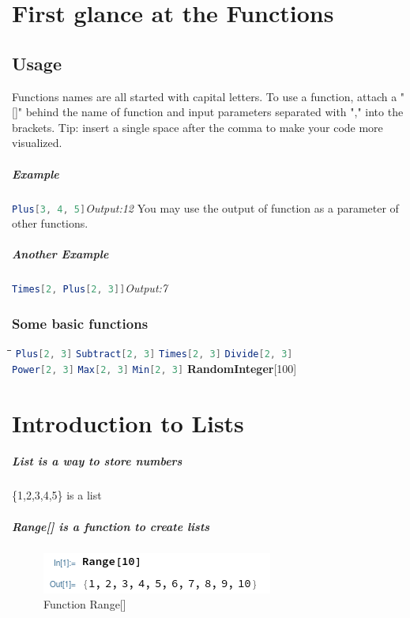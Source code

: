 \documentclass[UTF8]{book}
\newcommand{\iocode}[2]{\lstinline[language=Mathematica]|#1|\hspace{\fill}\emph{Output:#2}}
\newcommand{\incode}[1]{\lstinline[language=Mathematica]|#1|}
\begin{document}
		\chapter{First glance at the Functions}

			\section{Usage}
				Functions names are all started with capital letters. To use a function, attach a "[]" behind the name of function and input parameters separated with "," into the brackets. Tip: insert a single space after the comma to make your code more visualized.
				\paragraph{Example}
				\iocode{Plus[3, 4, 5]}{12}
				\newline\newline
				You may use the output of function as a parameter of other functions.
				\paragraph{Another Example}
				\iocode{Times[2, Plus[2, 3]]}{7}
			\subsection{Some basic functions}
			\begin{tabbing}
				\hspace{0.25\linewidth}\=\hspace{0.25\linewidth}\=\hspace{0.25\linewidth}\=\kill
				\incode{Plus[2, 3]} \> \incode{Subtract[2, 3]} \> \incode{Times[2, 3]} \> \incode{Divide[2, 3]} \\ 
				\incode{Power[2, 3]} \> \incode{Max[2, 3]} \> \incode{Min[2, 3]} \> \textbf{RandomInteger}[100] \\ 
			\end{tabbing} 
		\chapter{Introduction to Lists}
			\paragraph{List is a way to store numbers} \{1,2,3,4,5\} is a list
			\paragraph{Range[] is a function to create lists}
			\begin{figure}[h!]
				\centering
				\includegraphics[width=0.7\linewidth]{pics/Range}
				\caption{Function Range[]}
				\label{fig:range}
			\end{figure}
\end{document}
